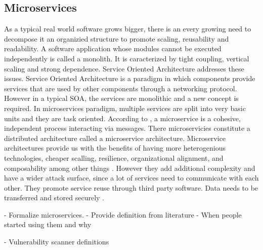 \subsection{Microservices}
\label{chap:microservices}

As a typical real world software grows bigger, there is an every growing need to decompose it an organizied structure to promote scaling, reusability and readability. A software application whose modules cannot be executed independently is called a monolith. It is caracterized by tight coupling, vertical scaling and strong dependence. Service Oriented Architecture addresses these issues. Service Oriented Architecture is a paradigm in which components provide services that are used by other components through a networking protocol. \cite{papazoglou2003service} However in a typical SOA, the services are monolithic and a new concept is required. \cite{ahmadvand2016requirements}
In microservices paradigm, multiple services are split into very basic units and they are task oriented. According to , a microservice is a cohesive, independent process interacting via messages. There microservicies constitute a distributed architecture called a microservice architecture.
Microservice architectures provide us with the benefits of having more heterogenious technologies, cheaper scalling, resilience, organizational alignment, and composability among other things \cite{newman2015building}. However they add additional complexity and have a wider attack surface, since a lot of services need to communicate with each other. They promote service reuse through third party software. Data needs to be transferred and stored securely .



- Formalize microservices. 
- Provide definition from literature
- When people started using them and why

- Vulnerability scanner definitions
